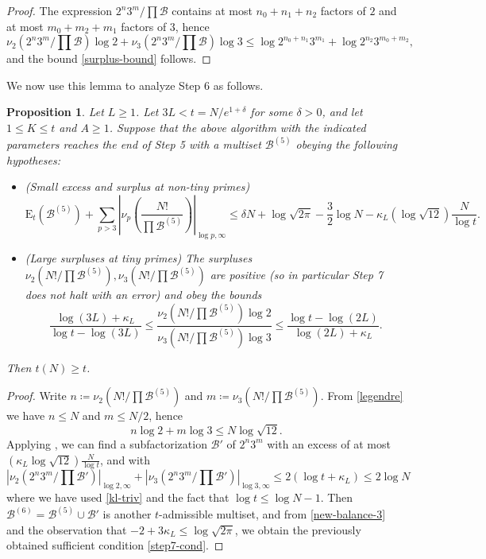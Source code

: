 \documentclass[12pt,a4paper,reqno]{amsart}
\numberwithin{equation}{section}
\theoremstyle{plain}
\newtheorem{proposition}[theorem]{Proposition}
\theoremstyle{definition}
\newcommand\tuple{{\mathcal B}}
\newcommand\excess{{\mathrm{E}}}
\begin{document}
\begin{proof}
  The expression $2^n 3^m / \prod \tuple$ contains at most $n_0+n_1+n_2$ factors of $2$ and at most $m_0+m_2+m_1$ factors of $3$, hence
  $$ \nu_2(2^n 3^m / \prod \tuple) \log 2 +
  \nu_3(2^n 3^m / \prod \tuple) \log 3
  \leq \log 2^{n_0+n_1} 3^{m_1} + \log 2^{n_2} 3^{m_0+m_2},$$
  and the bound \eqref{surplus-bound} follows.
  \end{proof}
  
We now use this lemma to analyze Step 6 as follows.

\begin{proposition}\label{step6-reduce} Let $L \geq 1$.
  Let $3L < t = N/e^{1+\delta}$ for some $\delta>0$, and let $1 \leq K \leq t$ and $A \geq 1$.  Suppose that the above algorithm with the indicated parameters reaches the end of Step 5 with a multiset $\tuple^{(5)}$ obeying the following hypotheses:
\begin{itemize}
  \item[(i)] (Small excess and surplus at non-tiny primes)
  \begin{equation}\label{new-balance-3}
    \excess_t(\tuple^{(5)}) + \sum_{p>3} \left|\nu_p\left(\frac{N!}{\prod \tuple^{(5)}}\right)\right|_{\log p,\infty} \leq \delta N + \log \sqrt{2\pi} - \frac{3}{2} \log N - \kappa_L (\log \sqrt{12}) \frac{N}{\log t}.
  \end{equation}
  \item[(ii)] (Large surpluses at tiny primes)
The surpluses $\nu_2(N!/\prod \tuple^{(5)}), \nu_3(N!/\prod \tuple^{(5)})$ are positive (so in particular Step 7 does not halt with an error) and obey the bounds
$$
\frac{\log(3L)+\kappa_L}{\log t - \log(3L)} \leq \frac{\nu_2(N!/\prod \tuple^{(5)}) \log 2}{\nu_3(N!/\prod \tuple^{(5)}) \log 3} \leq \frac{\log t - \log(2L)}{\log(2L)+\kappa_L}.
$$
\end{itemize}
Then $t(N) \geq t$.
\end{proposition}

  \begin{proof} Write $n \coloneqq \nu_2(N!/\prod \tuple^{(5)})$ and $m \coloneqq \nu_3(N!/\prod \tuple^{(5)})$.  From \eqref{legendre} we have $n \leq N$ and $m \leq N/2$, hence
    $$ n \log 2 + m \log 3 \leq N \log \sqrt{12}.$$
  Applying , we can find a subfactorization $\tuple'$ of $2^n 3^m$ with an excess of at most $(\kappa_L \log \sqrt{12}) \frac{N}{\log t}$, and with
  $$ |\nu_2(2^n 3^m/\prod \tuple')|_{\log 2,\infty}
  + |\nu_3(2^n 3^m/\prod \tuple')|_{\log 3,\infty}
   \leq 2(\log t + \kappa_L) \leq 2 \log N$$
   where we have used \eqref{kl-triv} and the fact that $\log t\leq \log N-1$.    Then $\tuple^{(6)} = \tuple^{(5)} \cup \tuple'$ is another $t$-admissible multiset, and from \eqref{new-balance-3} and the observation that $-2+3\kappa_L \leq \log \sqrt{2\pi}$, we obtain the previously obtained sufficient condition  \eqref{step7-cond}.
  \end{proof}
  
\end{document}
